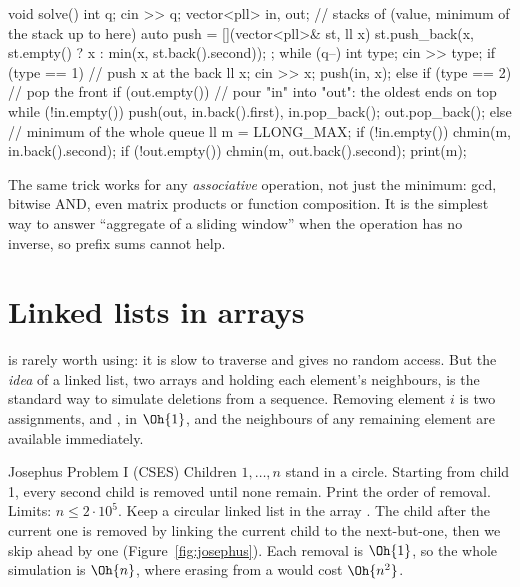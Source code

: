 \begin{code}
void solve() {
    int q;
    cin >> q;
    vector<pll> in, out;  // stacks of (value, minimum of the stack up to here)
    auto push = [](vector<pll>& st, ll x) {
        st.push_back({x, st.empty() ? x : min(x, st.back().second)});
    };
    while (q--) {
        int type;
        cin >> type;
        if (type == 1) {  // push x at the back
            ll x;
            cin >> x;
            push(in, x);
        } else if (type == 2) {  // pop the front
            if (out.empty())  // pour "in" into "out": the oldest ends on top
                while (!in.empty()) push(out, in.back().first), in.pop_back();
            out.pop_back();
        } else {  // minimum of the whole queue
            ll m = LLONG_MAX;
            if (!in.empty()) chmin(m, in.back().second);
            if (!out.empty()) chmin(m, out.back().second);
            print(m);
        }
    }
}
\end{code}

The same trick works for any \emph{associative} operation, not just the minimum: gcd, bitwise AND, even matrix products or
function composition. It is the simplest way to answer ``aggregate of a sliding window'' when the operation has no inverse, so
prefix sums cannot help.

\section[Linked lists in arrays]{Linked lists in arrays \hfill \silver}\label{sec:linked}

 is rarely worth using: it is slow to traverse and gives no random access. But the \emph{idea} of a linked list,
two arrays  and  holding each element's neighbours, is the standard way to simulate deletions from a
sequence. Removing element $i$ is two assignments,  and , in $\Oh{1}$, and
the neighbours of any remaining element are available immediately.

\begin{problem}{Josephus Problem I (CSES)}
Children $1, \dots, n$ stand in a circle. Starting from child 1, every second child is removed until none remain. Print the
order of removal. Limits: $n \le 2\cdot10^5$.
\solution Keep a circular linked list in the array . The child after the current one is removed by linking the
current child to the next-but-one, then we skip ahead by one (Figure~\ref{fig:josephus}). Each removal is $\Oh{1}$, so the
whole simulation is $\Oh{n}$, where erasing from a  would cost $\Oh{n^2}$.
\end{problem}

